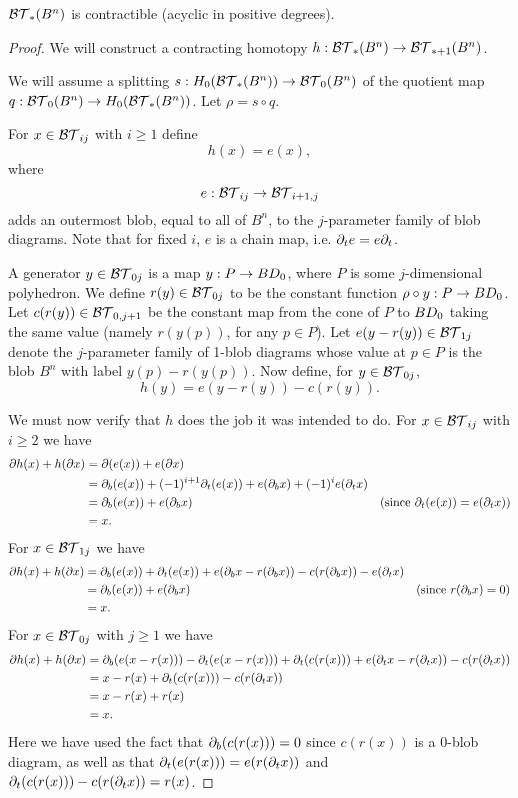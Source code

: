 \begin{lemma} \label{bt-contract}
${\mathcal{BT}}_*(B^n)$ is contractible (acyclic in positive degrees).
\end{lemma}
\begin{proof}
We will construct a contracting homotopy $h: {\mathcal{BT}}_*(B^n)\to {\mathcal{BT}}_{*+1}(B^n)$.

We will assume a splitting $s:H_0({\mathcal{BT}}_*(B^n))\to {\mathcal{BT}}_0(B^n)$
of the quotient map $q:{\mathcal{BT}}_0(B^n)\to H_0({\mathcal{BT}}_*(B^n))$.
Let $\rho = s\circ q$.

For $x\in {\mathcal{BT}}_{ij}$ with $i\ge 1$ define
\[
	h(x) = e(x) ,
\]
where
\[
	e: {\mathcal{BT}}_{ij}\to{\mathcal{BT}}_{i+1,j}
\]
adds an outermost blob, equal to all of $B^n$, to the $j$-parameter family of blob diagrams.
Note that for fixed $i$, $e$ is a chain map, i.e. $\partial_t e = e \partial_t$.

A generator $y\in {\mathcal{BT}}_{0j}$ is a map $y:P\to BD_0$, where $P$ is some $j$-dimensional polyhedron.
We define $r(y)\in {\mathcal{BT}}_{0j}$ to be the constant function $\rho\circ y : P\to BD_0$. 
Let $c(r(y))\in {\mathcal{BT}}_{0,j+1}$ be the constant map from the cone of $P$ to $BD_0$ taking
the same value (namely $r(y(p))$, for any $p\in P$).
Let $e(y - r(y)) \in {\mathcal{BT}}_{1j}$ denote the $j$-parameter family of 1-blob diagrams
whose value at $p\in P$ is the blob $B^n$ with label $y(p) - r(y(p))$.
Now define, for $y\in {\mathcal{BT}}_{0j}$,
\[
	h(y) = e(y - r(y)) - c(r(y)) .
\]

We must now verify that $h$ does the job it was intended to do.
For $x\in {\mathcal{BT}}_{ij}$ with $i\ge 2$ we have
\begin{align*}
	\partial h(x) + h(\partial x) &= \partial(e(x)) + e(\partial x) && \\
			&= \partial_b(e(x)) + (-1)^{i+1} \partial_t(e(x)) + e(\partial_b x) + (-1)^i e(\partial_t x) && \\
			&= \partial_b(e(x)) + e(\partial_b x) && \text{(since $\partial_t(e(x)) = e(\partial_t x)$)} \\
		 	&= x . &&
\end{align*}
For $x\in {\mathcal{BT}}_{1j}$ we have
\begin{align*}
	\partial h(x) + h(\partial x) &= \partial_b(e(x)) + \partial_t(e(x)) + e(\partial_b x - r(\partial_b x)) - c(r(\partial_b x)) - e(\partial_t x) && \\
			&= \partial_b(e(x)) + e(\partial_b x) && \text{(since $r(\partial_b x) = 0$)} \\
			&= x . &&
\end{align*}
For $x\in {\mathcal{BT}}_{0j}$ with $j\ge 1$ we have
\begin{align*}
	\partial h(x) + h(\partial x) &= \partial_b(e(x - r(x))) - \partial_t(e(x - r(x))) + \partial_t(c(r(x))) + 
											e(\partial_t x - r(\partial_t x)) - c(r(\partial_t x)) \\
			&= x - r(x) + \partial_t(c(r(x))) - c(r(\partial_t x)) \\
			&= x - r(x) + r(x) \\
			&= x.
\end{align*}
Here we have used the fact that $\partial_b(c(r(x))) = 0$ since $c(r(x))$ is a $0$-blob diagram, 
as well as that $\partial_t(e(r(x))) = e(r(\partial_t x))$
and $\partial_t(c(r(x))) - c(r(\partial_t x))  = r(x)$.


\end{proof}
